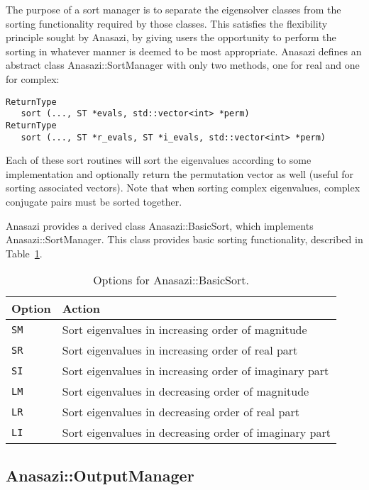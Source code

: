 The purpose of a sort manager is to separate the eigensolver classes from the
sorting functionality required by those classes. This satisfies the flexibility
principle sought by Anasazi, by giving users the opportunity to perform the
sorting in whatever manner is deemed to be most appropriate. Anasazi defines an
abstract class Anasazi::SortManager with only two methods, one for real
and one for complex:
\begin{verbatim}
ReturnType  
   sort (..., ST *evals, std::vector<int> *perm) 
ReturnType 
   sort (..., ST *r_evals, ST *i_evals, std::vector<int> *perm)
\end{verbatim}
Each of these sort routines will sort the eigenvalues according to some
implementation and optionally return the permutation vector as well (useful for
sorting associated vectors). Note that when sorting complex eigenvalues, complex
conjugate pairs must be sorted together.

Anasazi provides a derived class Anasazi::BasicSort, which implements
Anasazi::SortManager. This class provides basic sorting functionality,
described in Table~\ref{tab:anasazi:sm}.

\begin{table}
\begin{center}
\begin{tabular}{| p{2cm} l |}
\hline
Option & Action \\
\hline
{\tt SM} & Sort eigenvalues in increasing order of magnitude \\
{\tt SR} & Sort eigenvalues in increasing order of real part \\
{\tt SI} & Sort eigenvalues in increasing order of imaginary part \\
{\tt LM} & Sort eigenvalues in decreasing order of magnitude \\
{\tt LR} & Sort eigenvalues in decreasing order of real part \\
{\tt LI} & Sort eigenvalues in decreasing order of imaginary part \\
\hline
\end{tabular}
\caption{Options for Anasazi::BasicSort.}
\label{tab:anasazi:sm}
\end{center}
\end{table}


\subsection{Anasazi::OutputManager}
\label{sec:anasazi:om}

